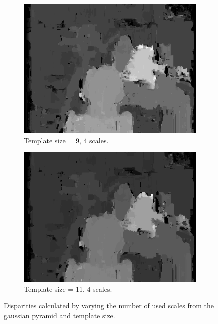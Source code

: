 \documentclass[12pt,a4paper,oneside,final]{article}
\begin{document}
\begin{figure}[H]
\begin{subfigure}[b]{0.24\textwidth}
	\includegraphics[width=\textwidth]{disparity_s4_k9set_1.png}
	\caption{Template size = 9, 4 scales.}
\end{subfigure}
\begin{subfigure}[b]{0.24\textwidth}
	\includegraphics[width=\textwidth]{disparity_s4_k11set_1.png}
	\caption{Template size = 11, 4 scales.}
\end{subfigure}
\caption{Disparities calculated by varying the number of used scales from the gaussian pyramid and template size.}
\label{fig:disparities}
\end{figure}
\end{document}
